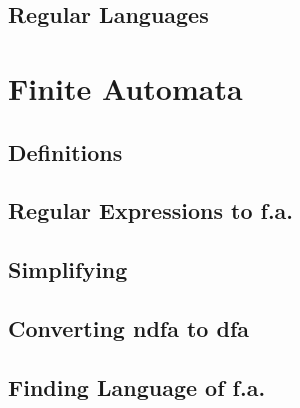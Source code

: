 \documentclass{article}
\begin{document}
		\subsection{Regular Languages}
	\section{Finite Automata}
		\subsection{Definitions}
		\subsection{Regular Expressions to f.a.}
		\subsection{Simplifying}
		\subsection{Converting ndfa to dfa}
		\subsection{Finding Language of f.a.}
	
\end{document}
